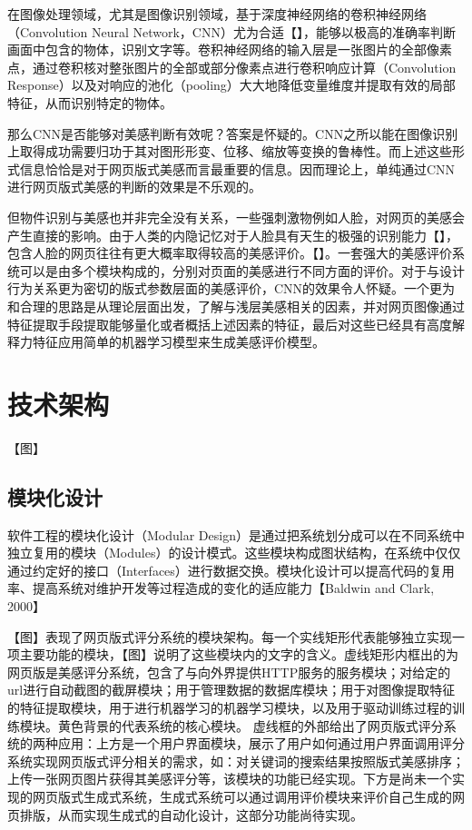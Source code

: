 在图像处理领域，尤其是图像识别领域，基于深度神经网络的卷积神经网络（Convolution Neural Network，CNN）尤为合适【】，能够以极高的准确率判断画面中包含的物体，识别文字等。卷积神经网络的输入层是一张图片的全部像素点，通过卷积核对整张图片的全部或部分像素点进行卷积响应计算（Convolution Response）以及对响应的池化（pooling）大大地降低变量维度并提取有效的局部特征，从而识别特定的物体。

那么CNN是否能够对美感判断有效呢？答案是怀疑的。CNN之所以能在图像识别上取得成功需要归功于其对图形形变、位移、缩放等变换的鲁棒性。而上述这些形式信息恰恰是对于网页版式美感而言最重要的信息。因而理论上，单纯通过CNN进行网页版式美感的判断的效果是不乐观的。

但物件识别与美感也并非完全没有关系，一些强刺激物例如人脸，对网页的美感会产生直接的影响。由于人类的内隐记忆对于人脸具有天生的极强的识别能力【】，包含人脸的网页往往有更大概率取得较高的美感评价。【】。一套强大的美感评价系统可以是由多个模块构成的，分别对页面的美感进行不同方面的评价。对于与设计行为关系更为密切的版式参数层面的美感评价，CNN的效果令人怀疑。一个更为和合理的思路是从理论层面出发，了解与浅层美感相关的因素，并对网页图像通过特征提取手段提取能够量化或者概括上述因素的特征，最后对这些已经具有高度解释力特征应用简单的机器学习模型来生成美感评价模型。

\section{技术架构}
【图】
\subsection{模块化设计}
软件工程的模块化设计（Modular Design）是通过把系统划分成可以在不同系统中独立复用的模块（Modules）的设计模式。这些模块构成图状结构，在系统中仅仅通过约定好的接口（Interfaces）进行数据交换。模块化设计可以提高代码的复用率、提高系统对维护开发等过程造成的变化的适应能力【Baldwin and Clark, 2000】

【图】表现了网页版式评分系统的模块架构。每一个实线矩形代表能够独立实现一项主要功能的模块，【图】说明了这些模块内的文字的含义。虚线矩形内框出的为网页版是美感评分系统，包含了与向外界提供HTTP服务的服务模块；对给定的url进行自动截图的截屏模块；用于管理数据的数据库模块；用于对图像提取特征的特征提取模块，用于进行机器学习的机器学习模块，以及用于驱动训练过程的训练模块。黄色背景的代表系统的核心模块。
虚线框的外部给出了网页版式评分系统的两种应用：上方是一个用户界面模块，展示了用户如何通过用户界面调用评分系统实现网页版式评分相关的需求，如：对关键词的搜索结果按照版式美感排序；上传一张网页图片获得其美感评分等，该模块的功能已经实现。下方是尚未一个实现的网页版式生成式系统，生成式系统可以通过调用评价模块来评价自己生成的网页排版，从而实现生成式的自动化设计，这部分功能尚待实现。

